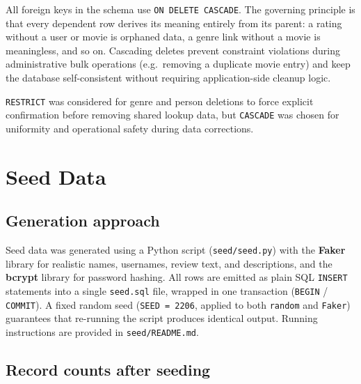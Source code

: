 \documentclass[11pt, a4paper]{article}
\begin{document}
All foreign keys in the schema use \texttt{ON DELETE CASCADE}. The
governing principle is that every dependent row derives its meaning
entirely from its parent: a rating without a user or movie is orphaned
data, a genre link without a movie is meaningless, and so on. Cascading
deletes prevent constraint violations during administrative bulk operations
(e.g.\ removing a duplicate movie entry) and keep the database
self-consistent without requiring application-side cleanup logic.

\texttt{RESTRICT} was considered for genre and person deletions to force
explicit confirmation before removing shared lookup data, but
\texttt{CASCADE} was chosen for uniformity and operational safety during
data corrections.

\newpage
\section{Seed Data}
\label{sec:seed}

\subsection{Generation approach}

Seed data was generated using a Python script (\texttt{seed/seed.py}) with
the \textbf{Faker} library for realistic names, usernames, review text, and
descriptions, and the \textbf{bcrypt} library for password hashing. All rows
are emitted as plain SQL \texttt{INSERT} statements into a single
\texttt{seed.sql} file, wrapped in one transaction (\texttt{BEGIN} /
\texttt{COMMIT}). A fixed random seed (\texttt{SEED = 2206}, applied to both
\texttt{random} and \texttt{Faker}) guarantees that re-running the script
produces identical output. Running instructions are provided in
\texttt{seed/README.md}.

\subsection{Record counts after seeding}
\end{document}
